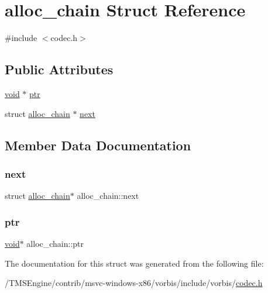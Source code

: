 \hypertarget{structalloc__chain}{}\section{alloc\+\_\+chain Struct Reference}
\label{structalloc__chain}


{\ttfamily \#include $<$codec.\+h$>$}

\subsection*{Public Attributes}
\begin{DoxyCompactItemize}
\item 
\hyperlink{_s_d_l__opengles2__gl2ext_8h_ae5d8fa23ad07c48bb609509eae494c95}{void} $\ast$ \hyperlink{structalloc__chain_a564538413768f266bd5bda09d892e99d}{ptr}
\item 
struct \hyperlink{structalloc__chain}{alloc\+\_\+chain} $\ast$ \hyperlink{structalloc__chain_a596f6605e59080015c3c6dfd07326c83}{next}
\end{DoxyCompactItemize}


\subsection{Member Data Documentation}
\mbox{\label{structalloc__chain_a596f6605e59080015c3c6dfd07326c83}} 
\subsubsection{\texorpdfstring{next}{next}}
{\footnotesize\ttfamily struct \hyperlink{structalloc__chain}{alloc\+\_\+chain}$\ast$ alloc\+\_\+chain\+::next}

\mbox{\label{structalloc__chain_a564538413768f266bd5bda09d892e99d}} 
\subsubsection{\texorpdfstring{ptr}{ptr}}
{\footnotesize\ttfamily \hyperlink{_s_d_l__opengles2__gl2ext_8h_ae5d8fa23ad07c48bb609509eae494c95}{void}$\ast$ alloc\+\_\+chain\+::ptr}



The documentation for this struct was generated from the following file\+:\begin{DoxyCompactItemize}
\item 
/\+T\+M\+S\+Engine/contrib/msvc-\/windows-\/x86/vorbis/include/vorbis/\hyperlink{codec_8h}{codec.\+h}\end{DoxyCompactItemize}
